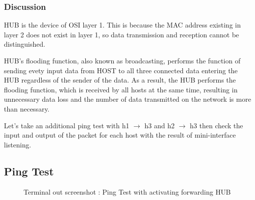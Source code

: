 \subsubsection*{Discussion}
HUB is the device of OSI layer 1. This is because the MAC address existing in layer 2 does not exist in layer 1, so data transmission and reception cannot be distinguished.

HUB's flooding function, also known as broadcasting, performs the function of sending evety input data from HOST to all three connected data entering the HUB regardless of the sender of the data.
As a result, the HUB performs the flooding function, which is received by all hosts at the same time, resulting in unnecessary data loss and the number of data transmitted on the network is more than necessary.

Let's take an additional ping test with h1 $\to$ h3 and h2 $\to$ h3 then check the input and output of the packet for each host with the result of mini-interface listening.
\subsection{Ping Test}
\begin{figure}[h!]
\centering
{}
\hfill
{}\caption{Terminal out screenshot : Ping Test with activating forwarding HUB}
\end{figure}

\clearpage
